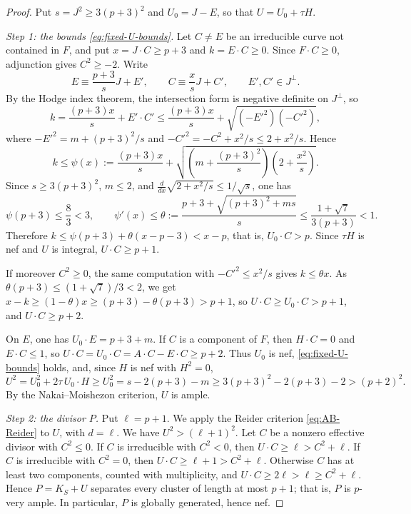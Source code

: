 \documentclass[11pt,reqno]{amsart}
\numberwithin{equation}{section}
\theoremstyle{remark}
\begin{document}
\begin{proof}
Put \(s=J^2\geq3(p+3)^2\) and \(U_0=J-E\), so that \(U=U_0+\tau H\).

\smallskip\noindent\emph{Step 1: the bounds \eqref{eq:fixed-U-bounds}.} Let \(C\neq E\) be an irreducible curve not contained in \(F\), and put \(x=J\cdot C\geq p+3\) and \(k=E\cdot C\geq0\). Since \(F\cdot C\geq0\), adjunction gives \(C^2\geq-2\). Write
\[
 E\equiv\frac{p+3}{s}J+E',\qquad C\equiv\frac{x}{s}J+C',\qquad E',C'\in J^\perp.
\]
By the Hodge index theorem, the intersection form is negative definite on \(J^\perp\), so
\[
 k=\frac{(p+3)x}{s}+E'\cdot C'\leq\frac{(p+3)x}{s}+\sqrt{(-E'^2)(-C'^2)},
\]
where \(-E'^2=m+(p+3)^2/s\) and \(-C'^2=-C^2+x^2/s\leq2+x^2/s\). Hence
\begin{equation*}
 k\leq\psi(x):=\frac{(p+3)x}{s}
       +\sqrt{\left(m+\frac{(p+3)^2}{s}\right)
                     \left(2+\frac{x^2}{s}\right)}.
\end{equation*}
Since \(s\geq3(p+3)^2\), \(m\leq2\), and \(\frac{d}{dx}\sqrt{2+x^2/s}\leq1/\sqrt s\), one has
\[
 \psi(p+3)\leq\frac83<3,\qquad
 \psi'(x)\leq\theta:=\frac{p+3+\sqrt{(p+3)^2+ms}}s
       \leq\frac{1+\sqrt7}{3(p+3)}<1.
\]
Therefore \(k\leq\psi(p+3)+\theta(x-p-3)<x-p\), that is, \(U_0\cdot C>p\). Since \(\tau H\) is nef and \(U\) is integral, \(U\cdot C\geq p+1\).

If moreover \(C^2\geq0\), the same computation with \(-C'^2\leq x^2/s\) gives \(k\leq\theta x\). As \(\theta(p+3)\leq(1+\sqrt7)/3<2\), we get \(x-k\geq(1-\theta)x\geq(p+3)-\theta(p+3)>p+1\), so \(U\cdot C\geq U_0\cdot C>p+1\), and \(U\cdot C\geq p+2\).

On \(E\), one has \(U_0\cdot E=p+3+m\). If \(C\) is a component of \(F\), then \(H\cdot C=0\) and \(E\cdot C\leq1\), so \(U\cdot C=U_0\cdot C=A\cdot C-E\cdot C\geq p+2\). Thus \(U_0\) is nef, \eqref{eq:fixed-U-bounds} holds, and, since \(H\) is nef with \(H^2=0\),
\[
 U^2=U_0^2+2\tau\,U_0\cdot H\geq U_0^2=s-2(p+3)-m
   \geq3(p+3)^2-2(p+3)-2>(p+2)^2.
\]
By the Nakai--Moishezon criterion, \(U\) is ample.

\smallskip\noindent\emph{Step 2: the divisor \(P\).} Put \(\ell=p+1\). We apply the Reider criterion \eqref{eq:AB-Reider} to \(U\), with \(d=\ell\). We have \(U^2>(\ell+1)^2\). Let \(C\) be a nonzero effective divisor with \(C^2\leq0\). If \(C\) is irreducible with \(C^2<0\), then \(U\cdot C\geq\ell>C^2+\ell\). If \(C\) is irreducible with \(C^2=0\), then \(U\cdot C\geq\ell+1>C^2+\ell\). Otherwise \(C\) has at least two components, counted with multiplicity, and \(U\cdot C\geq2\ell>\ell\geq C^2+\ell\). Hence \(P=K_S+U\) separates every cluster of length at most \(p+1\); that is, \(P\) is \(p\)-very ample. In particular, \(P\) is globally generated, hence nef.


\end{proof}
\end{document}
